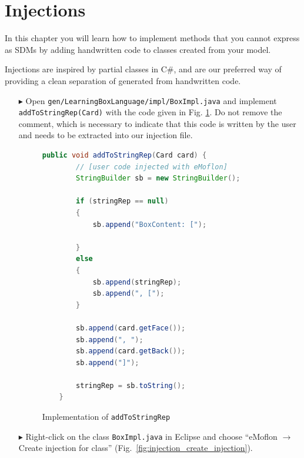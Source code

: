 \section{Injections}
\label{sec:intro_injections}

In this chapter you will learn how to implement methods that you cannot express as SDMs by adding handwritten code to classes created from your model.

Injections are inspired by partial classes in C\#, and are our preferred way of providing a clean separation of generated from handwritten code.

\begin{enumerate}
    \item[$\blacktriangleright$] Open \texttt{gen/LearningBoxLanguage/impl/BoxImpl.java} and implement \texttt{addToStringRep(Card)} with the code given in Fig. \ref{fig:addToStringRep_impl}. 
    Do not remove the comment, which is necessary to indicate that this code is written by the user and needs to be extracted into our injection file.

    \begin{figure}[htbp]
        \centering
        \begin{lstlisting}[language=Java, keywordstyle={\bfseries\color{purple}}, backgroundcolor=\color{white}]
    public void addToStringRep(Card card) {
        // [user code injected with eMoflon]
        StringBuilder sb = new StringBuilder();

        if (stringRep == null)
        {
            sb.append("BoxContent: [");

        }
        else
        {
            sb.append(stringRep);
            sb.append(", [");
        }

        sb.append(card.getFace());
        sb.append(", ");
        sb.append(card.getBack());
        sb.append("]");

        stringRep = sb.toString();
    }
        \end{lstlisting}
        \caption{Implementation of \texttt{addToStringRep}}
        \label{fig:addToStringRep_impl}
    \end{figure}

    \item[$\blacktriangleright$] Right-click on the class \texttt{BoxImpl.java} in Eclipse and choose ``eMoflon $\rightarrow$ Create injection for class'' (Fig.~\ref{fig:injection_create_injection}).


\end{enumerate}
